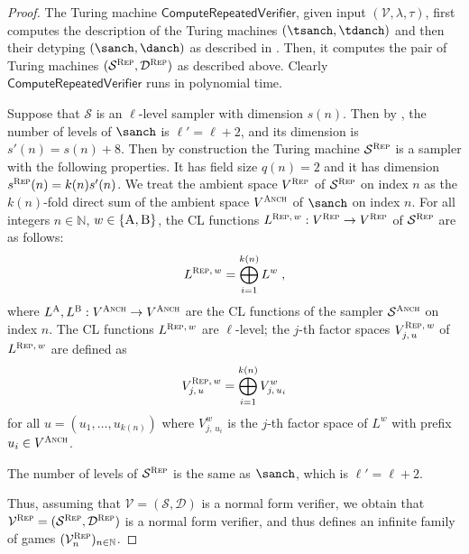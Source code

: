 \documentclass[11pt]{article}
\theoremstyle{definition}
\newcommand{\N}{\ensuremath{\mathbb{N}}}
\newcommand{\sampler}{\mathcal{S}}
\newcommand{\decider}{\mathcal{D}}
\newcommand{\verifier}{\mathcal{V}}
\newcommand{\gamestyle}[1]{\ensuremath{\textsc{#1}}\xspace}
\newcommand{\labelstyle}[1]{\ensuremath{\textsc{#1}}\xspace}
\newcommand{\alice}{\labelstyle{A}}
\newcommand{\bob}{\labelstyle{B}}
\newcommand{\AB}{\{\alice, \bob\}}
\newcommand{\anch}{\gamestyle{Anch}}
\newcommand{\tmstyle}[1]{\ensuremath{\mathsf{#1}}}
\newcommand{\ComputeParrepVerifier}{\tmstyle{ComputeRepeatedVerifier}}
\newcommand{\rep}{\gamestyle{Rep}}
\begin{document}
\begin{proof}

The Turing machine $\ComputeParrepVerifier$, given input $(\verifier,\lambda,\tau)$, first
computes the description of the Turing machines $(\tsanch,\tdanch)$ and then their detyping $(\sanch,\danch)$ 
as described in . Then, it computes the pair of Turing machines $(\sampler^\rep,\decider^\rep)$ as described above. 
Clearly $\ComputeParrepVerifier$ runs in polynomial time. 


Suppose that $\sampler$ is an $\ell$-level sampler with dimension $s(n)$. Then by , the number of levels of $\sanch$ is $\ell' = \ell+2$, and its dimension is $s'(n) = s(n)+8$. Then by construction the Turing machine $\sampler^\rep$ is a sampler with the following properties. It has field size $q(n) = 2$ 
and it has dimension $s^\rep(n) = k(n) s'(n)$.
We treat the ambient space $V^\rep$ of $\sampler^\rep$ on index $n$ as the
$k(n)$-fold direct sum of the ambient space $V^\anch$ of $\sanch$ on index $n$.
For all integers $n \in \N$, $w \in \AB$, the CL functions $L^{\rep,\,
  w}: V^\rep \to V^\rep$ of $\sampler^\rep$ are as follows:
\begin{equation*}
	L^{\rep,\, w} = \bigoplus_{i = 1}^{k(n)} L^w\;,
\end{equation*}
where $L^\alice,L^\bob:V^\anch \to V^\anch$ are the CL functions of the sampler $\sampler^\anch$
on index $n$. The CL functions $L^{\rep,\, w}$ are $\ell$-level; the $j$-th
factor spaces $V^{\rep,\, w}_{j,\, u}$ of $L^{\rep,\, w}$ are defined as
\begin{equation*}
	V^{\rep,\, w}_{j,\, u} = \bigoplus_{i = 1}^{k(n)} V^w_{j,\, u_i}
\end{equation*}
for all $u = (u_1,\ldots,u_{k(n)})$ where $V^w_{j,\, u_i}$ is the $j$-th factor
space of $L^w$ with prefix $u_i \in V^\anch$.







The number of levels of $\sampler^\rep$ is the same as $\sanch$, which is $\ell' = \ell + 2$. 

Thus, assuming that $\verifier = (\sampler,\decider)$ is a normal form verifier, we obtain that $\verifier^\rep = (\sampler^\rep,\decider^\rep)$ is a normal form verifier, and thus defines an infinite family of games $(\verifier_n^\rep)_{n \in \N}$. 




\end{proof}
\end{document}
